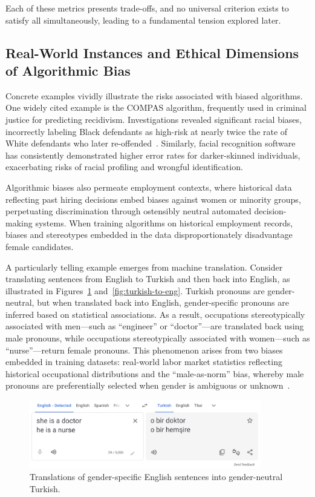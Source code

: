 Each of these metrics presents trade-offs, and no universal criterion exists to satisfy all simultaneously,
 leading to a fundamental tension explored later.

 
 \subsection{Real-World Instances and Ethical Dimensions of Algorithmic Bias}\label{subsec:real_world_bias}

 Concrete examples vividly illustrate the risks associated with biased algorithms. One widely cited example is the COMPAS algorithm, frequently used in criminal justice for predicting recidivism. Investigations revealed significant racial biases, incorrectly labeling Black defendants as high-risk at nearly twice the rate of White defendants who later re-offended~\cite{angwin2016machine}. Similarly, facial recognition software has consistently demonstrated higher error rates for darker-skinned individuals, exacerbating risks of racial profiling and wrongful identification.
 
 Algorithmic biases also permeate employment contexts, where historical data reflecting past hiring decisions embed biases against women or minority groups, perpetuating discrimination through ostensibly neutral automated decision-making systems. When training algorithms on historical employment records, biases and stereotypes embedded in the data disproportionately disadvantage female candidates.
 
 A particularly telling example emerges from machine translation. Consider translating sentences from English to Turkish and then back into English, as illustrated in Figures~\ref{fig:eng-to-turkish} and~\ref{fig:turkish-to-eng}. Turkish pronouns are gender-neutral, but when translated back into English, gender-specific pronouns are inferred based on statistical associations. As a result, occupations stereotypically associated with men—such as ``engineer'' or ``doctor''—are translated back using male pronouns, while occupations stereotypically associated with women—such as ``nurse''—return female pronouns. This phenomenon arises from two biases embedded in training datasets: real-world labor market statistics reflecting historical occupational distributions and the ``male-as-norm'' bias, whereby male pronouns are preferentially selected when gender is ambiguous or unknown~\cite{caliskan2017semantics}.
 
 \begin{figure}[h]
     \centering
     \includegraphics[width=0.9\textwidth]{sections/background/eng-to-turkish.png}
     \caption{Translations of gender-specific English sentences into gender-neutral Turkish.}
     \label{fig:eng-to-turkish}
 \end{figure}
 
